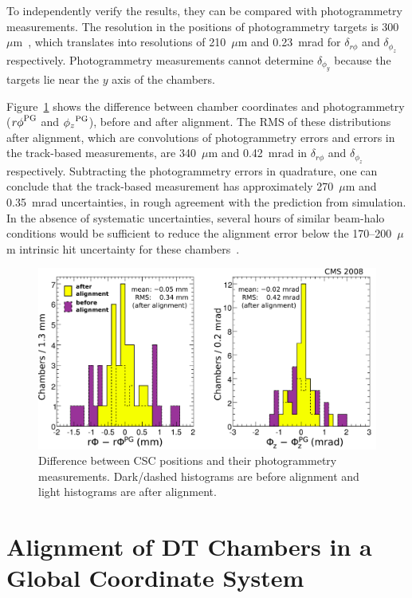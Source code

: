 To independently verify the results, they can be compared with
photogrammetry measurements.  The resolution in the positions of
photogrammetry targets is 300~$\mu$m~\cite{ref:endcapPG}, which
translates into resolutions of 210~$\mu$m and 0.23~mrad for
$\delta_{r\phi}$ and $\delta_{\phi_z}$ respectively.  Photogrammetry measurements cannot
determine $\delta_{\phi_y}$ because the targets lie near the $y$ axis
of the chambers.

Figure~\ref{fig:overlaps_data2} shows the difference between chamber
coordinates and photogrammetry (${r\phi}^{\mbox{\scriptsize PG}}$ and
${\phi_z}^{\mbox{\scriptsize PG}}$), before and after alignment.  The
RMS of these distributions after alignment, which are convolutions of 
photogrammetry errors and errors in the track-based measurements, are
340~$\mu$m and 0.42~mrad in $\delta_{r\phi}$ and $\delta_{\phi_z}$ respectively.
Subtracting the photogrammetry errors in quadrature, one can conclude that
the track-based measurement has approximately 270~$\mu$m and 0.35~mrad
uncertainties, in rough agreement with the prediction from simulation.
In the absence of systematic uncertainties, several hours of similar
beam-halo conditions would be sufficient to reduce the alignment error
below the 170--200~$\mu$m intrinsic hit uncertainty for these
chambers~\cite{ref:csc_resolution}.

\begin{figure}
\centering
\includegraphics[width=0.75\linewidth]{plots/csc_overlaps_alignment/delta_both_goodcolors.pdf}
\caption{Difference between CSC positions and their photogrammetry
measurements.  Dark/dashed histograms are before alignment
and light histograms are after alignment.  \label{fig:overlaps_data2}}
\end{figure}

\section{Alignment of DT Chambers in a Global Coordinate System}
\label{sec:global_muon_alignment}

